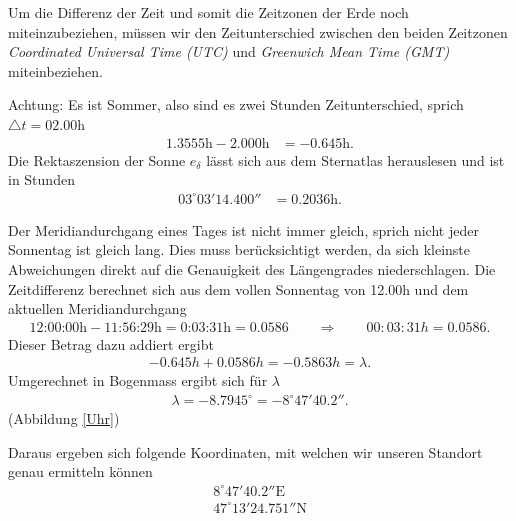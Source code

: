 \begin{refsection}
Um die Differenz der Zeit und somit die Zeitzonen der Erde noch miteinzubeziehen, müssen wir den Zeitunterschied zwischen den beiden Zeitzonen \textit{Coordinated Universal Time (UTC)} und \textit{Greenwich Mean Time (GMT)} miteinbeziehen.

Achtung: Es ist Sommer, also sind es zwei Stunden Zeitunterschied, sprich $\triangle{t}=02.00$h
\begin{align*}
1.3555 \text{h} - 2.000 \text{h} &= -0.645 \text{h}.
\end{align*}
Die Rektaszension der Sonne $e_\delta$ lässt sich aus dem Sternatlas herauslesen und ist in Stunden
\begin{align*}
03^{\circ} 03' 14.400'' &= 0.2036 \text{h}.
\end{align*}

Der Meridiandurchgang eines Tages ist nicht immer gleich, sprich nicht jeder Sonnentag ist gleich lang. Dies muss berücksichtigt werden, da sich kleinste Abweichungen direkt auf die Genauigkeit des Längengrades niederschlagen.
Die Zeitdifferenz berechnet sich aus dem vollen Sonnentag von 12.00h und dem aktuellen Meridiandurchgang
\begin{align*}
\text{12:00:00h} - \text{11:56:29h} = \text{0:03:31h} = 0.0586
\qquad \Rightarrow \qquad
00:03:31h = 0.0586.
\end{align*}
Dieser Betrag dazu addiert ergibt
\begin{align*}
-0.645 h + 0.0586 h = - 0.5863 h = \lambda.
\end{align*}
Umgerechnet in Bogenmass ergibt sich für $\lambda$
\begin{align*}
\lambda = - 8.7945^{\circ} = -8^{\circ} 47' 40.2''.
\end{align*}
(Abbildung \ref{Uhr})

Daraus ergeben sich folgende Koordinaten, mit welchen wir unseren Standort genau ermitteln können
\begin{align*}
8^{\circ}  47'  40.2'' \text{E} \\
47^{\circ}  13'  24.751'' \text{N}
\end{align*}




\printbibliography[heading=subbibliography]
\end{refsection}







